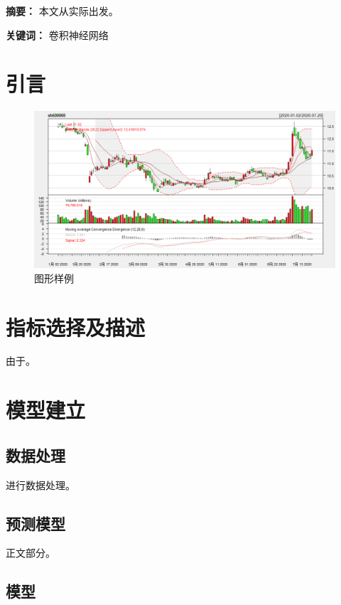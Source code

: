 \documentclass[10pt]{ctexart}
\begin{document}
	
	\newpage
	
	
	\textbf{\heiti 摘要：} 本文从实际出发。
	
	
	\textbf{\heiti 关键词：} 卷积神经网络
	
\section{引言}
	

	\begin{figure}[H]
		\centering
		\includegraphics[width=0.95\linewidth]{figs/1}
		\caption[图1]{图形样例}
		\label{fig:1}
	\end{figure}
	

	
	
	
	
	\section{指标选择及描述}
	由于。
	
\section{模型建立}
	
	\subsection{数据处理}
	
		进行数据处理。
		
	\subsection{预测模型}
	
		正文部分。
		
		
	\subsection{模型}
		
\end{document}
